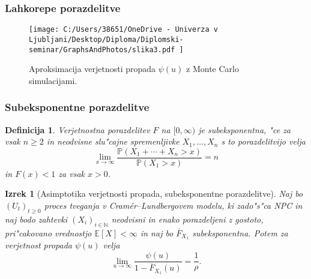 \documentclass[]{beamer} %
\theoremstyle{plain}
\newtheorem{izrek}{Izrek}
\newtheorem{definicija}{Definicija}
\newcommand{\N}{\mathbb{N}}
\newcommand{\E}{\mathbb{E}}
\newcommand{\Prob}{\mathbb{P}}
\begin{document}
\begin{frame}
  \frametitle{Lahkorepe porazdelitve}
  \begin{figure}[H]
    \centering
    \texttt{[image: 
        C:/Users/38651/OneDrive - Univerza v Ljubljani/Desktop/Diploma/Diplomski-seminar/GraphsAndPhotos/slika3.pdf
        ]}
    \caption{Aproksimacija verjetnosti propada $\psi(u)$ z Monte Carlo simulacijami.}
    \label{fig:slika4}
\end{figure}
\end{frame}

\begin{frame}
  \frametitle{Subeksponentne porazdelitve}
  \begin{definicija}
    Verjetnostna porazdelitev $F$ na $[0, \infty)$ je \textit{subeksponentna}, "ce za vsak $n\geq2$ in 
    neodvisne slu"cajne spremenljivke $X_1, \dots, X_n$ s to porazdelitvijo velja 
    \begin{equation*}
        \lim_{x\to\infty}\frac{\Prob\left(X_1 + \cdots + X_n > x\right)}{\Prob\left(X_1 > x\right)} = n
    \end{equation*}
    in $F(x) < 1$ za vsak $x > 0$.
    \label{def:subeksponentnaPorazdelitev}
  \end{definicija}
\end{frame}

\begin{frame}
  \begin{izrek}[Asimptotika verjetnosti propada, subeksponentne porazdelitve]
    Naj bo $(U_t)_{t\geq0}$ proces tveganja v Cramér--Lundbergovem modelu, ki zado"s"ca NPC in 
    naj bodo zahtevki $(X_i)_{i\in\N}$ neodvisni in enako porazdeljeni z gostoto, 
    pri"cakovano vrednostjo $\E\left[X\right] < \infty$ in naj bo $\overline{F}_{X_1}$ subeksponentna.
    Potem za verjetnost propada $\psi(u)$ velja
    \begin{equation*}
        \lim_{u\to\infty}\frac{\psi(u)}{1 - \overline{F}_{X_1}(u)} = \frac{1}{\rho}.
        \label{eq:tezkorepnePorazdelitveAsimptotika}
    \end{equation*}
    \label{izr:tezkorepnePorazdelitveAsimptotika}
  \end{izrek}
\end{frame}
\end{document}
